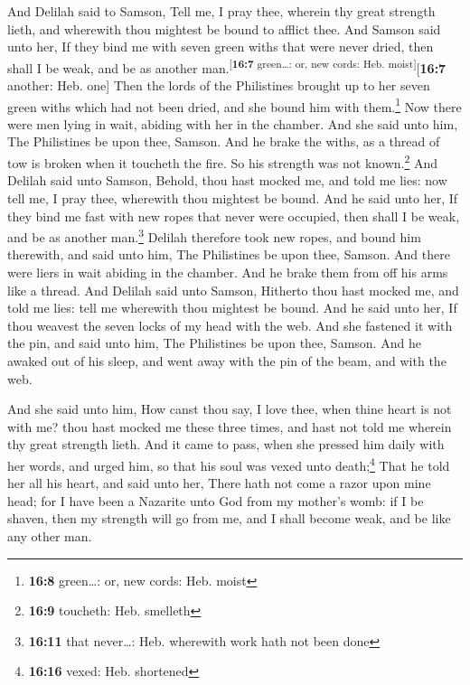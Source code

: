  And Delilah said to Samson, Tell me, I pray thee, wherein
thy great strength lieth, and wherewith thou mightest be bound to
afflict thee.  And Samson said unto her, If they bind me
with seven green withs that were never dried, then shall I be weak, and
be as another man.\textsuperscript{{[}\textbf{16:7} green\ldots: or, new
cords: Heb. moist{]}}{[}\textbf{16:7} another: Heb. one{]}
 Then the lords of the Philistines brought up to her seven
green withs which had not been dried, and she bound him with
them.\footnote{\textbf{16:8} green\ldots: or, new cords: Heb. moist}
 Now there were men lying in wait, abiding with her in the
chamber. And she said unto him, The Philistines be upon thee, Samson.
And he brake the withs, as a thread of tow is broken when it toucheth
the fire. So his strength was not known.\footnote{\textbf{16:9}
  toucheth: Heb. smelleth}  And Delilah said unto Samson,
Behold, thou hast mocked me, and told me lies: now tell me, I pray thee,
wherewith thou mightest be bound.  And he said unto her,
If they bind me fast with new ropes that never were occupied, then shall
I be weak, and be as another man.\footnote{\textbf{16:11} that
  never\ldots: Heb. wherewith work hath not been done} 
Delilah therefore took new ropes, and bound him therewith, and said unto
him, The Philistines be upon thee, Samson. And there were liers in wait
abiding in the chamber. And he brake them from off his arms like a
thread.  And Delilah said unto Samson, Hitherto thou hast
mocked me, and told me lies: tell me wherewith thou mightest be bound.
And he said unto her, If thou weavest the seven locks of my head with
the web.  And she fastened it with the pin, and said unto
him, The Philistines be upon thee, Samson. And he awaked out of his
sleep, and went away with the pin of the beam, and with the web.

 And she said unto him, How canst thou say, I love thee,
when thine heart is not with me? thou hast mocked me these three times,
and hast not told me wherein thy great strength lieth. 
And it came to pass, when she pressed him daily with her words, and
urged him, so that his soul was vexed unto death;\footnote{\textbf{16:16}
  vexed: Heb. shortened}  That he told her all his heart,
and said unto her, There hath not come a razor upon mine head; for I
have been a Nazarite unto God from my mother's womb: if I be shaven,
then my strength will go from me, and I shall become weak, and be like
any other man.

